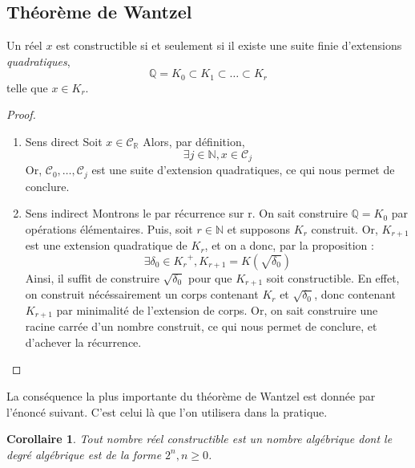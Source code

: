 \documentclass[a4paper,12pt,french]{report}
\newtheorem{corollaire}{Corollaire}[section]
\begin{document}
		\subsection{Théorème de Wantzel}
			\begin{theorem}
				Un réel \( x \) est constructible si et seulement si il existe une suite finie d'extensions \emph{quadratiques},
					\[
					\mathbb{Q} = K_0 \subset K_1 \subset \dots \subset K_r
					\]
				telle que \( x \in K_r \).
			\end{theorem}
			\begin{proof}
				\begin{enumerate}
					\item{Sens direct}
					Soit \(x \in \mathscr{C}_\mathbb{R}\)
					Alors, par définition, 
					\[\exists j \in \mathbb{N}, x \in \mathscr{C}_j
					\]
					Or, \(\mathscr{C}_0, \dots, \mathscr{C}_j\) est une suite d'extension quadratiques, ce qui nous permet de conclure.
					\item{Sens indirect} Montrons le par récurrence sur r. On sait construire \(\mathbb{Q} = K_0\) par opérations élémentaires. Puis, soit \(r \in \mathbb{N}\) et supposons \(K_r \) construit. Or, \(K_{r+1}\) est une extension quadratique de \(K_{r}\), et on a donc, par la proposition :
					\[
					\exists \delta_0 \in {K_r}^+, K_{r+1} = K(\sqrt{\delta_0})
					\]
					Ainsi, il suffit de construire \(\sqrt{\delta_0}\) pour que \(K_{r+1}\) soit constructible. En effet, on construit nécéssairement un corps contenant \(K_r\) et \(\sqrt{\delta_0}\), donc contenant \(K_{r+1}\) par minimalité de l'extension de corps.
					Or, on sait construire une racine carrée d'un nombre construit, ce qui nous permet de conclure, et d'achever la récurrence.
				\end{enumerate}
			\end{proof}
		La conséquence la plus importante du théorème de Wantzel est donnée par l'énoncé suivant. C'est celui là que l'on utilisera dans la pratique.
			
		    \begin{corollaire}
		     Tout nombre réel constructible est un nombre algébrique dont le degré algébrique est de la forme \( 2^{n}, n\geq 0 \).
		     \end{corollaire}   
		     
\end{document}
